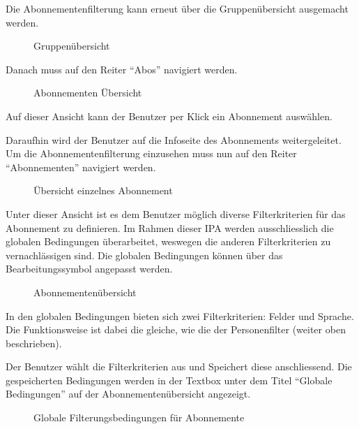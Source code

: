 Die Abonnementenfilterung kann erneut über die Gruppenübersicht ausgemacht werden.

\begin{figure}[h]
   \centering
   \caption{Gruppenübersicht}
\end{figure}

Danach muss auf den Reiter ``Abos'' navigiert werden.

\begin{figure}[h]
   \centering
   \caption{Abonnementen Übersicht}
\end{figure}

Auf dieser Ansicht kann der Benutzer per Klick ein Abonnement auswählen.

\newpage

Daraufhin wird der Benutzer auf die Infoseite des Abonnements weitergeleitet. Um die Abonnementenfilterung
einzusehen muss nun auf den Reiter ``Abonnementen'' navigiert werden.

\begin{figure}[h]
   \centering
   \caption{Übersicht einzelnes Abonnement}
\end{figure}

Unter dieser Ansicht ist es dem Benutzer möglich diverse Filterkriterien für das Abonnement zu definieren.
Im Rahmen dieser IPA werden ausschliesslich die globalen Bedingungen überarbeitet, weswegen die anderen Filterkriterien
zu vernachlässigen sind. Die globalen Bedingungen können über das Bearbeitungssymbol angepasst werden.

\begin{figure}[h]
   \centering
   \caption{Abonnementenübersicht}
\end{figure}

\newpage


In den globalen Bedingungen bieten sich zwei Filterkriterien: Felder und Sprache. Die Funktionsweise
ist dabei die gleiche, wie die der Personenfilter (weiter oben beschrieben).

Der Benutzer wählt die Filterkriterien aus und Speichert diese anschliessend. Die gespeicherten Bedingungen 
werden in der Textbox unter dem Titel ``Globale Bedingungen'' auf der Abonnementenübersicht angezeigt.
\begin{figure}[h]
   \centering
   \caption{Globale Filterungsbedingungen für Abonnemente}
\end{figure}


